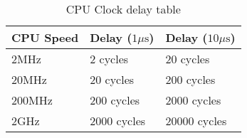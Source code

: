 \begin{table}[H]
\caption{CPU Clock delay table}
\begin{center}
    \begin{tabular} { | m{3cm} | m{3cm} | m{3cm} |}
        \hline
        CPU Speed & Delay ($1\mu \textrm{s}$) & Delay ($10\mu \textrm{s}$)\\
        \hline
        2MHz & 2 cycles & 20 cycles\\
        20MHz & 20 cycles & 200 cycles\\
        200MHz & 200 cycles & 2000 cycles\\
        2GHz & 2000 cycles & 20000 cycles\\
        \hline
    \end{tabular}
\end{center}
\end{table}
